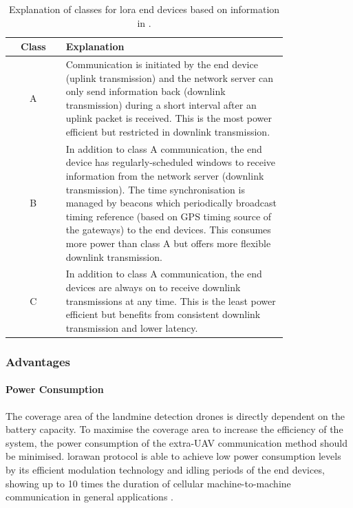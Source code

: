 \begin{table}[h!]
    \centering
    \begin{tabular}{c p{0.8\linewidth}}
    \hline
        \textbf{Class} & \textbf{Explanation} \\
    \hline
        A & Communication is initiated by the end device (uplink transmission) and the network server can only send information back (downlink transmission) during a short interval after an uplink packet is received. This is the most power efficient but restricted in downlink transmission. \\
    \hline
        B & In addition to class A communication, the end device has regularly-scheduled windows to receive information from the network server (downlink transmission). The time synchronisation is managed by beacons which periodically broadcast timing reference (based on GPS timing source of the gateways) to the end devices. This consumes more power than class A but offers more flexible downlink transmission. \\
    \hline
        C & In addition to class A communication, the end devices are always on to receive downlink transmissions at any time. This is the least power efficient but benefits from consistent downlink transmission and lower latency. \\
    \hline
    \end{tabular}
    \caption[Explanation of Classes for LoRa End Devices]
    {Explanation of classes for \gls{lora} end devices based on information in \cite{semtech2024lora}.}
    \label{tab:euc_loraclasses}
\end{table}

\subsubsection{Advantages}

\paragraph{Power Consumption} The coverage area of the landmine detection drones is directly dependent on the battery capacity. To maximise the coverage area to increase the efficiency of the system, the power consumption of the extra-\gls{UAV} communication method should be minimised. \gls{lorawan} protocol is able to achieve low power consumption levels by its efficient modulation technology and idling periods of the end devices, showing up to 10 times the duration of cellular machine-to-machine communication in general applications \cite{semtech2024lora}. 

